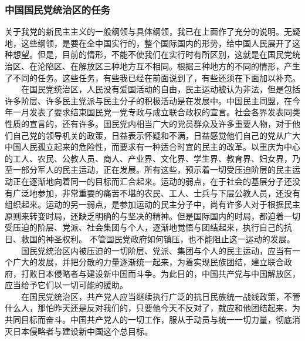 \documentclass[cn,11pt,chinese]{elegantbook}
\def\myformat#1{\hfil\hfil #1}
\begin{document}
\subsubsection*{\myformat{中国国民党统治区的任务}}
关于我党的新民主主义的一般纲领与具体纲领，我已在上面作了充分的说明。无疑地，这些纲领，是要在全中国实行的，整个国际国内的形势，给中国人民展开了这种想望。但是，目前的情形，不能不使我们在实行时有所区别，这就是在国民党统治区、在沦陷区、在解放区三种地方互不相同。根据三种地方的不同的情形，产生了不同的任务。这些任务，有些我已经在前面说到了，有些还须在下面加以补充。\\
　　在国民党统治区，人民没有爱国活动的自由，民主运动被认为非法，但是包括许多阶层、许多民主党派与民主分子的积极活动是在发展中。中国民主同盟，在今年一月发表了要求结束国民党一党专政与成立联合政权的宣言。社会各界发表同类性质的宣言的，还有许多。国民党内相当广大的党员群众及许多重要人物，对于他们自己党的领导机关的政策，日益表示怀疑和不满，日益感觉他们自己的党从广大中国人民孤立起来的危险性，而要求有一种适合时宜的民主的改革。以重庆为中心的工人、农民、公教人员、商人、产业界、文化界、学生界、教育界、妇女界，乃至一部分军人的民主运动，正在发展。所有这些，预示着一切受压迫阶层的民主运动正在逐渐地向着同一的目标而汇合起来。运动的弱点，在于社会的基层分子还没有广泛地参加，非常重要的痛苦不堪的农民、工人、士兵与下层公教人员，还没有组织起来。运动的另一弱点，是参加运动的民主分子中，尚有许多人对于根据民主原则来转变时局，还缺乏明确的与坚决的精神。但是国际国内的时局，都迫着一切受压迫的阶层、党派、社会集团与个人，逐渐地觉悟与团结起来，执行自己的抗日、救国的神圣权利。 不管国民党政府如何镇压，也不能阻止这一运动的发展。\\
　　国民党统治区内被压迫的一切阶层、党派、集团与个人的民主运动，应当有一个广大的发展，并把分散的力量逐渐统一起来，为着实现民族团结，建立联合政府，打败日本侵略者与建设新中国而斗争。为此目的，中国共产党与中国解放区，应当给予它们以一切可能的援助。\\
　　在国民党统治区，共产党人应当继续执行广泛的抗日民族统一战线政策，不管什么人，那怕昨天还是反对我们的，只要他今天不反对了，就应和他团结起来，为共同目标而奋斗。中国共产党人的一切工作，服从于动员与统一一切力量，彻底消灭日本侵略者与建设新中国这个总目标。\\
\end{document}
